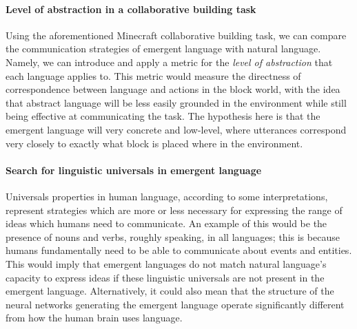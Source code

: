 \paragraph{Level of abstraction in a collaborative building task}
Using the aforementioned Minecraft collaborative building task, we can compare the communication strategies of emergent language with natural language.
Namely, we can introduce and apply a metric for the \emph{level of abstraction} that each language applies to.
This metric would measure the directness of correspondence between language and actions in the block world, with the idea that abstract language will be less easily grounded in the environment while still being effective at communicating the task.
The hypothesis here is that the emergent language will very concrete and low-level, where utterances correspond very closely to exactly what block is placed where in the environment.

\paragraph{Search for linguistic universals in emergent language}
Universals properties in human language, according to some interpretations, represent strategies which are more or less necessary for expressing the range of ideas which humans need to communicate.
An example of this would be the presence of nouns and verbs, roughly speaking, in all languages; this is because humans fundamentally need to be able to communicate about events and entities.
This would imply that emergent languages do not match natural language's capacity to express ideas if these linguistic universals are not present in the emergent language.
Alternatively, it could also mean that the structure of the neural networks generating the emergent language operate significantly different from how the human brain uses language. 

